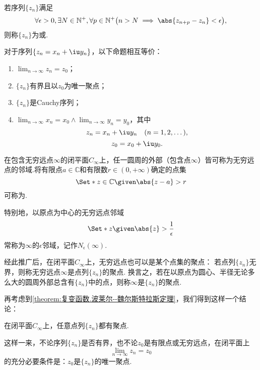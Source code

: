 \begin{definition}
若序列\(\{z_n\}\)满足\[
\forall \epsilon > 0, \exists N \in \mathbb{N}^+, \forall p\in\mathbb{N}^+ \bigl(
n > N  \implies  \abs{z_{n+p} - z_n} < \epsilon
\bigr),
\]则称\(\{z_n\}\)为或.
\end{definition}

\begin{theorem}
对于序列\(\{z_n = x_n + \iu y_n\}\)，以下命题相互等价：
\begin{enumerate}
\item \(\lim_{n\to\infty} z_n = z_0\)；

\item \(\{z_n\}\)有界且以\(z_0\)为唯一聚点；

\item \(\{z_n\}\)是Cauchy序列；

\item \(\lim_{n\to\infty} x_n = x_0 \land \lim_{n\to\infty} y_n = y_0\)，其中\[
z_n = x_n + \iu y_n \quad(n = 1,2,\dotsc),
\]\[
z_0 = x_0 + \iu y_0.
\]
\end{enumerate}
\end{theorem}

\begin{definition}
在包含无穷远点\(\infty\)的闭平面\(C_\infty\)上，任一圆周的外部（包含点\(\infty\)）皆可称为无穷远点的邻域.将有限点\(a\in\mathbb{C}\)和有限数\(r\in(0,+\infty)\)确定的点集\[
\Set*{ z\in\mathbb{C} \given \abs{z-a}>r }
\]可称为.

特别地，以原点为中心的无穷远点邻域\[
\Set*{ z \given \abs{z} > \frac{1}{\epsilon} }
\]常称为\(\infty\)的\(\epsilon\)邻域，记作\(N_{\epsilon}(\infty)\).
\end{definition}
经此推广后，在闭平面\(C_\infty\)上，无穷远点也可以是某个点集的聚点：
若点列\(\{z_n\}\)无界，则称无穷远点\(\infty\)是点列\(\{z_n\}\)的聚点.
换言之，若在以原点为圆心、半径无论多么大的圆周外部总含有\(\{z_n\}\)中的点，则称\(\infty\)是\(\{z_n\}\)的聚点.

再考虑到\cref{theorem:复变函数.波莱尔--魏尔斯特拉斯定理}，我们得到这样一个结论：
\begin{theorem}
在闭平面\(C_\infty\)上，任意点列\(\{z_n\}\)都有聚点.
\end{theorem}
这样一来，不论序列\(\{z_n\}\)是否有界，也不论\(z_0\)是有限点或无穷远点，在闭平面上\[
\lim_{n\to\infty} z_n = z_0
\]的充分必要条件是：\(z_0\)是\(\{z_n\}\)的唯一聚点.

